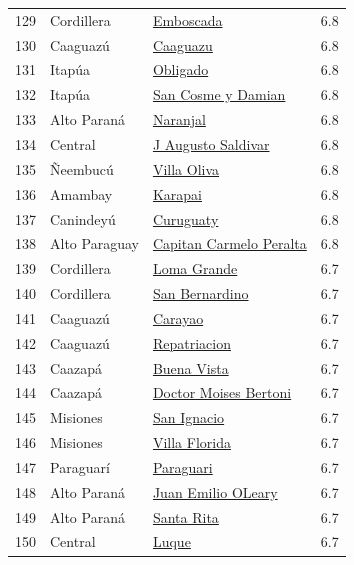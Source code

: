 {\begin{longtable}[]{@{}llll@{}}
129 & Cordillera & \hyperref[dist:03_Cordillera:Emboscada]{Emboscada} & 6.8 \\
130 & Caaguazú & \hyperref[dist:05_Caaguazu:Caaguazu]{Caaguazu} & 6.8 \\
131 & Itapúa & \hyperref[dist:07_Itapua:Obligado]{Obligado} & 6.8 \\
132 & Itapúa & \hyperref[dist:07_Itapua:San_Cosme_y_Damian]{San Cosme y Damian} & 6.8 \\
133 & Alto Paraná & \hyperref[dist:10_Alto_Parana:Naranjal]{Naranjal} & 6.8 \\
134 & Central & \hyperref[dist:11_Central:J_Augusto_Saldivar]{J Augusto Saldivar} & 6.8 \\
135 & Ñeembucú & \hyperref[dist:12_Neembucu:Villa_Oliva]{Villa Oliva} & 6.8 \\
136 & Amambay & \hyperref[dist:13_Amambay:Karapai]{Karapai} & 6.8 \\
137 & Canindeyú & \hyperref[dist:14_Canindeyu:Curuguaty]{Curuguaty} & 6.8 \\
138 & Alto Paraguay & \hyperref[dist:17_Alto_Paraguay:Capitan_Carmelo_Peralta]{Capitan Carmelo Peralta} & 6.8 \\
139 & Cordillera & \hyperref[dist:03_Cordillera:Loma_Grande]{Loma Grande} & 6.7 \\
140 & Cordillera & \hyperref[dist:03_Cordillera:San_Bernardino]{San Bernardino} & 6.7 \\
141 & Caaguazú & \hyperref[dist:05_Caaguazu:Carayao]{Carayao} & 6.7 \\
142 & Caaguazú & \hyperref[dist:05_Caaguazu:Repatriacion]{Repatriacion} & 6.7 \\
143 & Caazapá & \hyperref[dist:06_Caazapa:Buena_Vista]{Buena Vista} & 6.7 \\
144 & Caazapá & \hyperref[dist:06_Caazapa:Doctor_Moises_Bertoni]{Doctor Moises Bertoni} & 6.7 \\
145 & Misiones & \hyperref[dist:08_Misiones:San_Ignacio]{San Ignacio} & 6.7 \\
146 & Misiones & \hyperref[dist:08_Misiones:Villa_Florida]{Villa Florida} & 6.7 \\
147 & Paraguarí & \hyperref[dist:09_Paraguari:Paraguari]{Paraguari} & 6.7 \\
148 & Alto Paraná & \hyperref[dist:10_Alto_Parana:Juan_Emilio_OLeary]{Juan Emilio OLeary} & 6.7 \\
149 & Alto Paraná & \hyperref[dist:10_Alto_Parana:Santa_Rita]{Santa Rita} & 6.7 \\
150 & Central & \hyperref[dist:11_Central:Luque]{Luque} & 6.7 \\

\end{longtable}}

